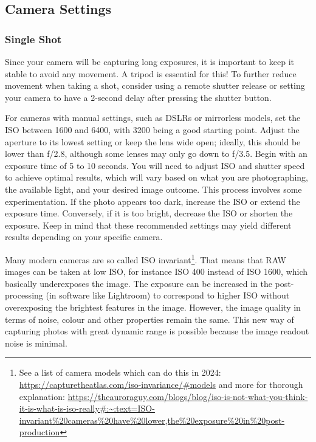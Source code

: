 \documentclass{article}
\begin{document}
\subsection{Camera Settings}
\subsubsection{Single Shot}\label{ISOinvariance}
Since your camera will be capturing long exposures, it is important to keep it stable to avoid any movement. A tripod is essential for this! To further reduce movement when taking a shot, consider using a remote shutter release or setting your camera to have a 2-second delay after pressing the shutter button.

For cameras with manual settings, such as DSLRs or mirrorless models, set the ISO between 1600 and 6400, with 3200 being a good starting point. Adjust the aperture to its lowest setting or keep the lens wide open; ideally, this should be lower than f/2.8, although some lenses may only go down to f/3.5. Begin with an exposure time of 5 to 10 seconds. You will need to adjust ISO and shutter speed to achieve optimal results, which will vary based on what you are photographing, the available light, and your desired image outcome. This process involves some experimentation. If the photo appears too dark, increase the ISO or extend the exposure time. Conversely, if it is too bright, decrease the ISO or shorten the exposure. Keep in mind that these recommended settings may yield different results depending on your specific camera.

Many modern cameras are so called ISO invariant\footnote{See a list of camera models which can do this in 2024: \url{https://capturetheatlas.com/iso-invariance/\#models} and more for thorough explanation: \url{https://theauroraguy.com/blogs/blog/iso-is-not-what-you-think-it-is-what-is-iso-really\#:~:text=ISO-invariant\%20cameras\%20have\%20lower,the\%20exposure\%20in\%20post-production}}. That means that RAW images can be taken at low ISO, for instance ISO 400 instead of ISO 1600, which basically underexposes the image. The exposure can be increased in the post-processing (in software like Lightroom) to correspond to higher ISO without overexposing the brightest features in the image. However, the image quality in terms of noise, colour and other properties remain the same. This new way of capturing photos with great dynamic range is possible because the image readout noise is minimal.
\end{document}
